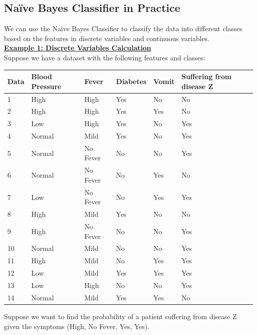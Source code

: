 \documentclass{book}
\begin{document}
\subsection{Naïve Bayes Classifier in Practice}
We can use the Naïve Bayes Classifier to classify the data into different classes based on the features in discrete variables and continuous variables.\\
\vspace{2mm}
\underline{\textbf{Example 1: Discrete Variables Calculation}}\\
Suppose we have a dataset with the following features and classes:
\begin{center}
    \begin{tabular}{|m{1cm}|m{2.5cm}|m{1.5cm}|m{1.5cm}|m{1cm}|m{4cm}|}
        \hline
        \rowcolor{lightblue}
        \textbf{Data} & \textbf{Blood Pressure} & \textbf{Fever} & \textbf{Diabetes} & \textbf{Vomit} & \textbf{Suffering from disease Z} \\
        \hline
        1 & High & High & Yes & No & No \\
        \hline
        2 & High & High & Yes & Yes & No \\
        \hline
        3 & Low & High & Yes & No & Yes \\
        \hline
        4 & Normal & Mild & Yes & No & Yes \\
        \hline
        5 & Normal & No Fever & No & No & Yes \\
        \hline
        6 & Normal & No Fever & No & Yes & No \\
        \hline
        7 & Low & No Fever & No & Yes & Yes \\
        \hline
        8 & High & Mild & Yes & No & No \\
        \hline
        9 & High & No Fever & No & No & Yes \\
        \hline
        10 & Normal & Mild & No & No & Yes \\
        \hline
        11 & High & Mild & No & Yes & Yes \\
        \hline
        12 & Low & Mild & Yes & Yes & Yes \\
        \hline
        13 & Low & High & No & No & Yes \\
        \hline
        14 & Normal & Mild & Yes & Yes & No \\
        \hline
    \end{tabular}
\end{center}
Suppose we want to find the probability of a patient suffering from disease Z given the symptoms (High, No Fever, Yes, Yes).\\
\end{document}
